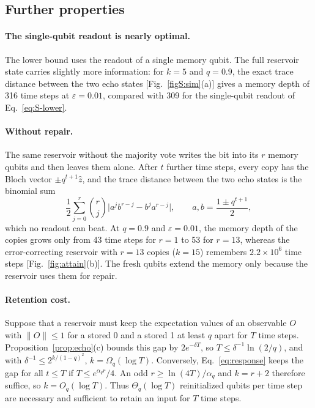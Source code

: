 \documentclass[aps,prl,twocolumn,superscriptaddress,floatfix]{revtex4-2}
\theoremstyle{plain}
\newcommand{\Norm}[1]{\lVert #1\rVert}
\begin{document}
\subsection{Further properties}

\paragraph*{The single-qubit readout is nearly optimal.} The lower bound uses the readout of a single memory qubit. The full reservoir state carries slightly more information: for $k=5$ and $q=0.9$, the exact trace distance between the two echo states [Fig.~\ref{figS:sim}(a)] gives a memory depth of 316 time steps at $\varepsilon=0.01$, compared with 309 for the single-qubit readout of Eq.~\eqref{eq:S-lower}.

\paragraph*{Without repair.} The same reservoir without the majority vote writes the bit into its $r$ memory qubits and then leaves them alone. After $t$ further time steps, every copy has the Bloch vector $\pm q^{t+1}\hat z$, and the trace distance between the two echo states is the binomial sum
\[
\frac12\sum_{j=0}^{r}\binom rj\bigl|a^jb^{r-j}-b^ja^{r-j}\bigr|,\qquad a,b=\frac{1\pm q^{t+1}}2,
\]
which no readout can beat. At $q=0.9$ and $\varepsilon=0.01$, the memory depth of the copies grows only from 43 time steps for $r=1$ to 53 for $r=13$, whereas the error-correcting reservoir with $r=13$ copies ($k=15$) remembers $2.2\times10^6$ time steps [Fig.~\ref{fig:attain}(b)]. The fresh qubits extend the memory only because the reservoir uses them for repair.

\paragraph*{Retention cost.} Suppose that a reservoir must keep the expectation values of an observable $O$ with $\Norm O\le1$ for a stored 0 and a stored 1 at least $q$ apart for $T$ time steps. Proposition~\ref{prop:echo}(c) bounds this gap by $2e^{-\delta T}$, so $T\le\delta^{-1}\ln(2/q)$, and with $\delta^{-1}\le2^{k/(1-q)^2}$, $k=\Omega_q(\log T)$. Conversely, Eq.~\eqref{eq:response} keeps the gap for all $t\le T$ if $T\le e^{\alpha_qr}/4$. An odd $r\ge\ln(4T)/\alpha_q$ and $k=r+2$ therefore suffice, so $k=O_q(\log T)$. Thus $\Theta_q(\log T)$ reinitialized qubits per time step are necessary and sufficient to retain an input for $T$ time steps.
\end{document}
